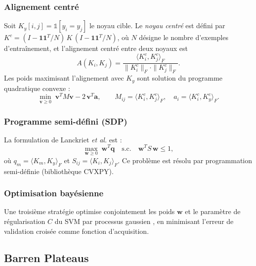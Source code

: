 \documentclass[12pt,a4paper]{article}
\begin{document}
\subsubsection{Alignement centré}

Soit $K_y[i,j] = \mathbb{1}[y_i = y_j]$ le noyau cible.
Le \emph{noyau centré} est défini par
$K^c = (I - \bm{1}\bm{1}^T\!/N)\,K\,(I - \bm{1}\bm{1}^T\!/N)$,
où $N$ désigne le nombre d'exemples d'entraînement,
et l'alignement centré entre deux noyaux est
\begin{equation}
  A(K_i, K_j) = \frac{\langle K_i^c, K_j^c \rangle_F}
                      {\|K_i^c\|_F \cdot \|K_j^c\|_F}.
\end{equation}
Les poids maximisant l'alignement avec $K_y$ sont solution du programme
quadratique convexe \cite{cortes2012} :
\begin{equation}
  \min_{\bm{v} \geq 0} \;
  \bm{v}^T M \bm{v} - 2\,\bm{v}^T \bm{a},
  \qquad M_{ij} = \langle K_i^c, K_j^c \rangle_F,
  \quad a_i = \langle K_i^c, K_y^c \rangle_F.
  \label{eq:ca}
\end{equation}

\subsubsection{Programme semi-défini (SDP)}

La formulation de Lanckriet \emph{et al.} \cite{lanckriet2004} est :
\begin{equation}
  \max_{\bm{w} \geq 0}\; \bm{w}^T \bm{q}
  \quad \text{s.c.}\quad \bm{w}^T S\, \bm{w} \leq 1,
  \label{eq:sdp}
\end{equation}
où $q_m = \langle K_m, K_y\rangle_F$ et $S_{ij} = \langle K_i, K_j\rangle_F$.
Ce problème est résolu par programmation semi-définie (bibliothèque CVXPY).

\subsubsection{Optimisation bayésienne}

Une troisième stratégie optimise conjointement les poids $\bm{w}$ et le
paramètre de régularisation $C$ du SVM par processus gaussien
\cite{snoek2012}, en minimisant l'erreur de validation croisée comme
fonction d'acquisition.

\subsection{Barren Plateaus}
\label{sec:barren}
\end{document}
